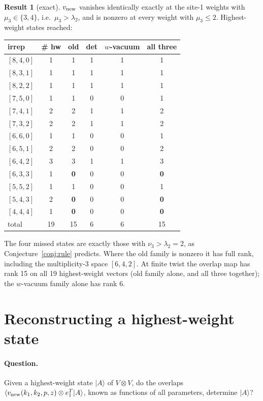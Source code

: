 \documentclass[11pt]{article}
\theoremstyle{definition}
\newtheorem{result}{Result}
\theoremstyle{remark}
\begin{document}
\begin{result}[exact]\label{res:420}
$v_{\rm new}$ vanishes identically exactly at the site-1 weights with $\mu_3\in\{3,4\}$, i.e.\ $\mu_3>\lambda_2$, and is nonzero at every weight with $\mu_3\le2$. Highest-weight states reached:
\begin{center}
\begin{tabular}{lccccc}\toprule
irrep & \# hw & old & det & $w$-vacuum & all three\\\midrule
$[8,4,0]$ & 1 & 1 & 1 & 1 & 1\\
$[8,3,1]$ & 1 & 1 & 1 & 1 & 1\\
$[8,2,2]$ & 1 & 1 & 1 & 1 & 1\\
$[7,5,0]$ & 1 & 1 & 0 & 0 & 1\\
$[7,4,1]$ & 2 & 2 & 1 & 1 & 2\\
$[7,3,2]$ & 2 & 2 & 1 & 1 & 2\\
$[6,6,0]$ & 1 & 1 & 0 & 0 & 1\\
$[6,5,1]$ & 2 & 2 & 0 & 0 & 2\\
$[6,4,2]$ & 3 & 3 & 1 & 1 & 3\\
$[6,3,3]$ & 1 & \textbf{0} & 0 & 0 & \textbf{0}\\
$[5,5,2]$ & 1 & 1 & 0 & 0 & 1\\
$[5,4,3]$ & 2 & \textbf{0} & 0 & 0 & \textbf{0}\\
$[4,4,4]$ & 1 & \textbf{0} & 0 & 0 & \textbf{0}\\\midrule
total & 19 & 15 & 6 & 6 & 15\\\bottomrule
\end{tabular}
\end{center}
The four missed states are exactly those with $\nu_3>\lambda_2=2$, as Conjecture~\ref{conj:rule} predicts. Where the old family is nonzero it has full rank, including the multiplicity-3 space $[6,4,2]$. At finite twist the overlap map has rank 15 on all 19 highest-weight vectors (old family alone, and all three together); the $w$-vacuum family alone has rank 6.
\end{result}

\section{Reconstructing a highest-weight state}

\paragraph{Question.}
Given a highest-weight state $|A\rangle$ of $V\otimes V$, do the overlaps $\langle v_{\rm new}(k_1,k_2,p,z)\otimes e_1^T|A\rangle$, known as functions of all parameters, determine $|A\rangle$?
\end{document}
